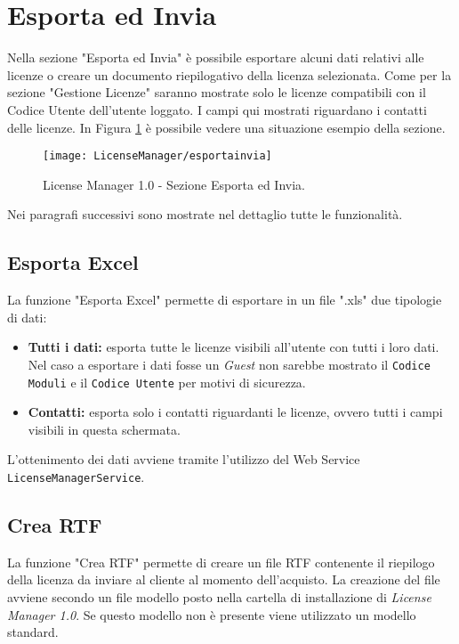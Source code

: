 
\section{Esporta ed Invia}

Nella sezione "Esporta ed Invia" è possibile esportare alcuni dati relativi alle licenze o creare un documento riepilogativo della licenza selezionata. Come per la sezione "Gestione Licenze" saranno mostrate solo le licenze compatibili con il Codice Utente dell’utente loggato. I campi qui mostrati riguardano i contatti delle licenze.
In Figura \ref{espinv} è possibile vedere una situazione esempio della sezione.

\begin{figure}[!h] 
    \centering 
    \texttt{[image: LicenseManager/esportainvia]} 
    \caption{License Manager 1.0 - Sezione Esporta ed Invia.}
\label{espinv}
\end{figure}

Nei paragrafi successivi sono mostrate nel dettaglio tutte le funzionalità. 

\subsection{Esporta Excel}

La funzione "Esporta Excel" permette di esportare in un file ".xls" due tipologie di dati:
\begin{itemize}

\item \textbf{Tutti i dati:} esporta tutte le licenze visibili all’utente con tutti i loro dati. Nel caso a esportare i dati fosse un \textit{Guest} non sarebbe mostrato il \texttt{Codice Moduli} e il \texttt{Codice Utente} per motivi di sicurezza.
\item \textbf{Contatti:} esporta solo i contatti riguardanti le licenze, ovvero tutti i campi visibili in questa schermata.

\end{itemize}

L'ottenimento dei dati avviene tramite l'utilizzo del Web Service \texttt{LicenseManagerService}.

\subsection{Crea RTF}
\label{creartf}
La funzione "Crea RTF" permette di creare un file RTF contenente il riepilogo della licenza da inviare al cliente al momento dell’acquisto. La creazione del file avviene secondo un file modello posto nella cartella di installazione di \textit{License Manager 1.0}. Se questo modello non è presente viene utilizzato un modello standard.


